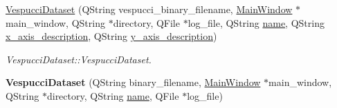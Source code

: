 \begin{DoxyCompactItemize}
\item 
\hyperlink{class_vespucci_dataset_abdada511afcfc13a2f5ffc09138a1755}{Vespucci\+Dataset} (Q\+String vespucci\+\_\+binary\+\_\+filename, \hyperlink{class_main_window}{Main\+Window} $\ast$main\+\_\+window, Q\+String $\ast$directory, Q\+File $\ast$log\+\_\+file, Q\+String \hyperlink{class_vespucci_dataset_a345a51b60127316b41caf92dc88fd792}{name}, Q\+String \hyperlink{class_vespucci_dataset_a7fb9e44d71e9e874eab1f5daaef86a5a}{x\+\_\+axis\+\_\+description}, Q\+String \hyperlink{class_vespucci_dataset_a997026da2bb3693568f62e156f9a5e49}{y\+\_\+axis\+\_\+description})
\begin{DoxyCompactList}\small\item\em Vespucci\+Dataset\+::\+Vespucci\+Dataset. \end{DoxyCompactList}\item 
{\bfseries Vespucci\+Dataset} (Q\+String binary\+\_\+filename, \hyperlink{class_main_window}{Main\+Window} $\ast$main\+\_\+window, Q\+String $\ast$directory, Q\+String \hyperlink{class_vespucci_dataset_a345a51b60127316b41caf92dc88fd792}{name}, Q\+File $\ast$log\+\_\+file)\hypertarget{class_vespucci_dataset_a32bc7599581ddbcf425c03de33997cb5}{}\label{class_vespucci_dataset_a32bc7599581ddbcf425c03de33997cb5}


\end{DoxyCompactItemize}
